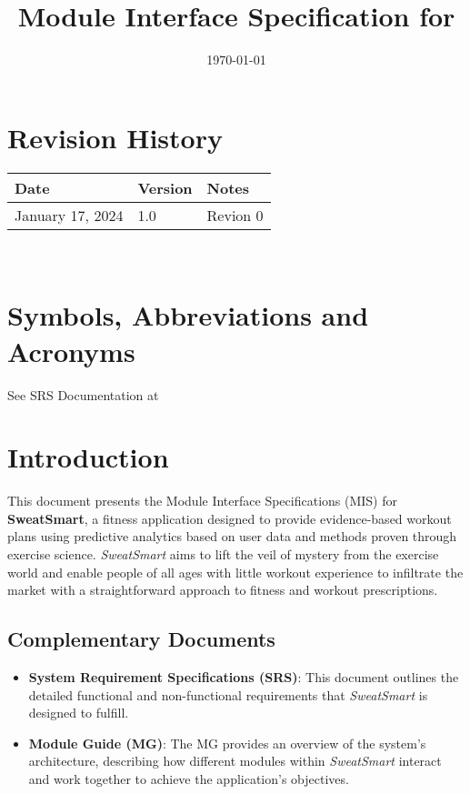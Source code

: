 \documentclass[12pt, titlepage]{article}
\begin{document}
\title{Module Interface Specification for \progname{}}

\author{\authname}

\date{\today}

\maketitle


\section{Revision History}

\begin{tabularx}{\textwidth}{p{3cm}p{2cm}X}
\toprule {\bf Date} & {\bf Version} & {\bf Notes}\\
\midrule
January 17, 2024 & 1.0 & Revion 0\\
\bottomrule
\end{tabularx}

~\newpage

\section{Symbols, Abbreviations and Acronyms}

See SRS Documentation at 


\newpage

\tableofcontents

\newpage


\section{Introduction}

This document presents the Module Interface Specifications (MIS) for \textbf{SweatSmart}, a fitness application designed to provide evidence-based workout plans using predictive analytics based on user data and methods proven through exercise science. \textit{SweatSmart} aims to lift the veil of mystery from the exercise world and enable people of all ages with little workout experience to infiltrate the market with a straightforward approach to fitness and workout prescriptions.

\subsection{Complementary Documents}
\begin{itemize}
    \item \textbf{System Requirement Specifications (SRS)}: This document outlines the detailed functional and non-functional requirements that \textit{SweatSmart} is designed to fulfill.
    \item \textbf{Module Guide (MG)}: The MG provides an overview of the system’s architecture, describing how different modules within \textit{SweatSmart} interact and work together to achieve the application's objectives.
\end{itemize}
\end{document}
